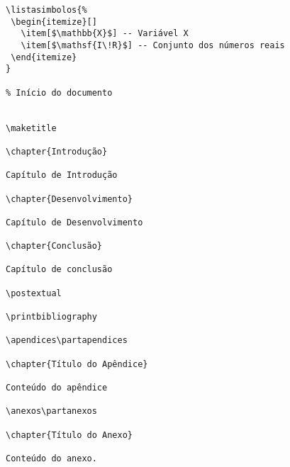 \begin{Verbatim}[frame=single, fontsize=\scriptsize]
% Lista de símbolos (opcional)
\listasimbolos{%
 \begin{itemize}[]
   \item[$\mathbb{X}$] -- Variável X
   \item[$\mathsf{I\!R}$] -- Conjunto dos números reais
 \end{itemize}
}

% Início do documento


\maketitle

\chapter{Introdução}

Capítulo de Introdução

\chapter{Desenvolvimento}

Capítulo de Desenvolvimento

\chapter{Conclusão}

Capítulo de conclusão

\postextual

\printbibliography

\apendices\partapendices

\chapter{Título do Apêndice}

Conteúdo do apêndice

\anexos\partanexos

\chapter{Título do Anexo}

Conteúdo do anexo.


\end{Verbatim}
